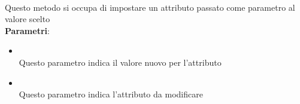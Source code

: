 \begin{itemize}
\begin{itemize}
\\ Questo metodo si occupa di impostare un attributo passato come parametro al valore scelto
\\ \textbf{Parametri}:
\begin{itemize}
\item {}
\\ Questo parametro indica il valore nuovo per l'attributo
\item {}
\\ Questo parametro indica l'attributo da modificare
\end{itemize}
\end{itemize}
\end{itemize}

\label{\nogloxy{swedesigner::client::model::celltypes::class::HxAssociation}}
